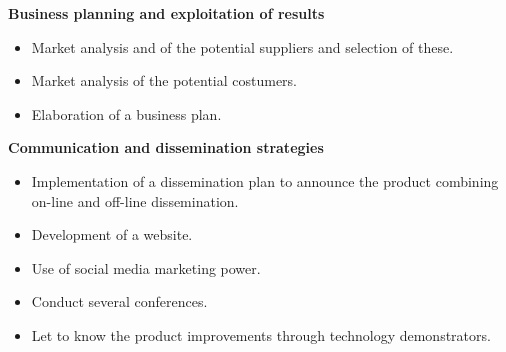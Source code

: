 {\bfseries Business planning and exploitation of results}
\begin{itemize}
	\item Market analysis and of the potential suppliers and selection of these.
	\item Market analysis of the potential costumers.
	\item Elaboration of a business plan. 

\end{itemize}


\textbf{Communication and dissemination strategies}
\begin{itemize}
	\item Implementation of a dissemination plan to announce the product combining on-line and off-line dissemination.	
	 \item Development of 
	  a website. 
	  \item Use of social media marketing power. 
	  \item Conduct several conferences.
	  \item Let to know the product improvements through technology demonstrators.
\end{itemize}




